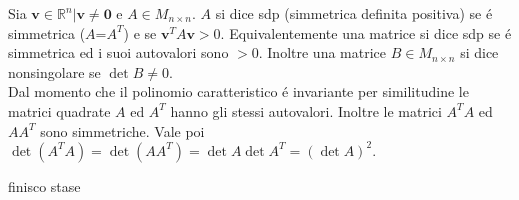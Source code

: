 Sia $\mathbf{v} \in \mathbb{R}^n| \mathbf{v} \neq \mathbf{0}$ e $A \in M_{n \times n}$.
$A$ si dice sdp (simmetrica definita positiva) se \'e simmetrica ($A$=$A^T$) e se $\mathbf{v}^TA\mathbf{v} > 0.$
Equivalentemente una matrice si dice sdp se \'e simmetrica ed i suoi autovalori sono $> 0.$
Inoltre una matrice $B \in M_{n \times n}$ si dice nonsingolare se $\det{B} \neq 0.$
\\
Dal momento che il polinomio caratteristico \'e invariante per similitudine le matrici quadrate $A$ ed $A^T$ hanno gli stessi autovalori.
Inoltre le matrici $A^TA$ ed $AA^T$ sono simmetriche.
Vale poi $\det{(A^TA)} = \det{(AA^T)} = \det{A}\det{A^T} = (\det{A})^2.$

finisco stase
